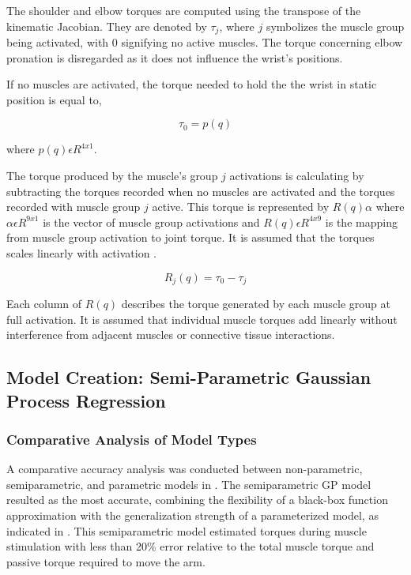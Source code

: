 The shoulder and elbow torques are computed using the transpose of the kinematic Jacobian. They are denoted by $\tau_{j}$, where $j$ symbolizes the muscle group being activated, with 0 signifying no active muscles. The torque concerning elbow pronation is disregarded as it does not influence the wrist's positions. 

If no muscles are activated, the torque needed to hold the the wrist in static position is equal to,

\begin{equation}
\tau_0 = p(q)
\end{equation}

where $p(q) \epsilon  R^{4x1}$. 

The torque produced by the muscle's group $j$ activations is calculating by subtracting the torques recorded when no muscles are activated and the torques recorded with muscle group $j$ active. This torque  is represented by $R(q)\alpha$ where $\alpha \epsilon R^{9x1}$ is the vector of muscle group activations and $R(q) \epsilon R^{4x9}$ is the mapping from muscle group activation to joint torque. It is assumed that the torques scales linearly with activation \cite{SPI}. 

\begin{equation}
    R_j(q) = \tau_0 - \tau_j
\end{equation}

Each column of $R(q)$ describes the torque generated by each muscle group at full activation. It is assumed that individual muscle torques add linearly without interference from adjacent muscles or connective tissue interactions. 




\newpage
\subsection{Model Creation: Semi-Parametric Gaussian Process Regression}

\subsubsection{Comparative Analysis of Model Types}

A comparative accuracy analysis was conducted between non-parametric, semiparametric, and parametric models in \cite{SPI}. The semiparametric GP model resulted as the most accurate, combining the flexibility of a black-box function approximation with the generalization strength of a parameterized model, as indicated in \cite{SPI}. This semiparametric model estimated torques during muscle stimulation with less than 20\% error relative to the total muscle torque and passive torque required to move the arm. 


